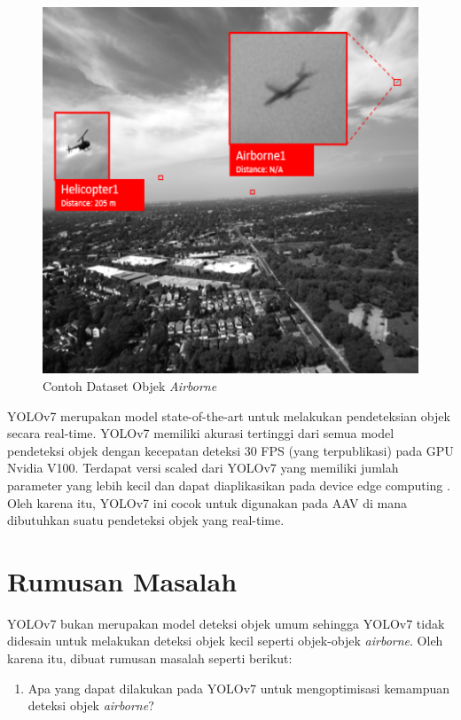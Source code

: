     \begin{figure} [ht]
        \centering
        \includegraphics[scale=0.5]{pictures/dataset-example-labeled.png}
        \caption{Contoh Dataset Objek \emph{Airborne}}
        \label{fig:airborne-object-example-1}
    \end{figure}

    YOLOv7 merupakan model state-of-the-art untuk melakukan pendeteksian objek secara real-time.
    YOLOv7 memiliki akurasi tertinggi dari semua model pendeteksi objek dengan kecepatan deteksi 30 FPS (yang terpublikasi) pada GPU Nvidia V100.
    Terdapat versi scaled dari YOLOv7 yang memiliki jumlah parameter yang lebih kecil dan dapat diaplikasikan pada device edge computing \parencite{yolov7}.
    Oleh karena itu, YOLOv7 ini cocok untuk digunakan pada AAV di mana dibutuhkan suatu pendeteksi objek yang real-time.

\section{Rumusan Masalah}
    YOLOv7 bukan merupakan model deteksi objek umum sehingga YOLOv7 tidak didesain untuk melakukan deteksi objek kecil seperti objek-objek \emph{airborne}.
    Oleh karena itu, dibuat rumusan masalah seperti berikut:
    \begin{enumerate}
        \item Apa yang dapat dilakukan pada YOLOv7 untuk mengoptimisasi kemampuan deteksi objek \emph{airborne}?
    \end{enumerate}

